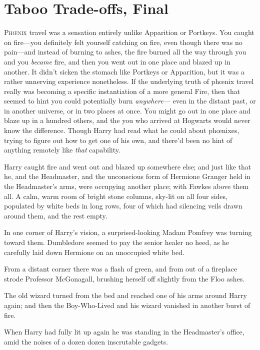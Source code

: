 \chapter{Taboo Trade-offs, Final}

\lettrine{P}{hœnix} travel was a sensation entirely unlike Apparition or Portkeys. You caught on fire—you definitely felt yourself catching on fire, even though there was no pain—and instead of burning to ashes, the fire burned all the way through you and you \emph{became} fire, and then you went out in one place and blazed up in another. It didn't sicken the stomach like Portkeys or Apparition, but it was a rather unnerving experience nonetheless. If the underlying truth of phœnix travel really was becoming a specific instantiation of a more general Fire, then that seemed to hint you could potentially burn \emph{anywhere—} even in the distant past, or in another universe, or in two places at once. You might go out in one place and blaze up in a hundred others, and the you who arrived at Hogwarts would never know the difference. Though Harry had read what he could about phœnixes, trying to figure out how to get one of his own, and there'd been no hint of anything remotely like \emph{that} capability.

Harry caught fire and went out and blazed up somewhere else; and just like that he, and the Headmaster, and the unconscious form of Hermione Granger held in the Headmaster's arms, were occupying another place; with Fawkes above them all. A calm, warm room of bright stone columns, sky-lit on all four sides, populated by white beds in long rows, four of which had silencing veils drawn around them, and the rest empty.

In one corner of Harry's vision, a surprised-looking Madam Pomfrey was turning toward them. Dumbledore seemed to pay the senior healer no heed, as he carefully laid down Hermione on an unoccupied white bed.

From a distant corner there was a flash of green, and from out of a fireplace strode Professor McGonagall, brushing herself off slightly from the Floo ashes.

The old wizard turned from the bed and reached one of his arms around Harry again; and then the Boy-Who-Lived and his wizard vanished in another burst of fire.

\later

When Harry had fully lit up again he was standing in the Headmaster's office, amid the noises of a dozen dozen inscrutable gadgets.

